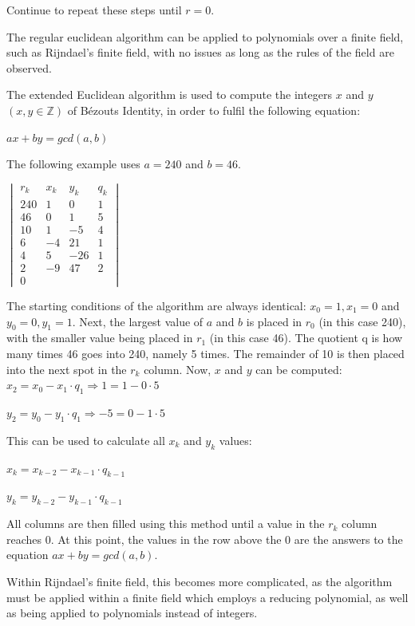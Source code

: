 \documentclass[12pt]{report}
\theoremstyle{definition}
\theoremstyle{remark}
\begin{document}
Continue to repeat these steps until $r=0$.

The regular euclidean algorithm can be applied to polynomials over a finite field, such as Rijndael's finite field, with no issues as long as the rules of the field are observed\cite{EuclideanPolynomials}.

The extended Euclidean algorithm is used to compute the integers $x$ and $y$ $({x,y} \in \mathbb{Z})$ of B\'ezouts Identity\cite{Bezout}, in order to fulfil the following equation:

$ax+by = gcd(a,b)$

The following example uses $a=240$ and $b=46$.

\begin{center}
$\begin{vmatrix}
r_k & x_k & y_k & q_k \\
240 & 1 & 0 & 1 \\
46 & 0 & 1 & 5 \\
10 & 1 & -5 & 4 \\
6 & -4 & 21 & 1 \\
4 & 5 & -26 & 1 \\
2 & -9 & 47 & 2 \\
0 &  &  &  \end{vmatrix}$
\end{center}

The starting conditions of the algorithm are always identical: $x_0=1, x_1=0$ and $y_0=0, y_1=1$. Next, the largest value of $a$ and $b$ is placed in $r_0$ (in this case 240), with the smaller value being placed in $r_1$ (in this case 46). The quotient q is how many times 46 goes into 240, namely 5 times. The remainder of 10 is then placed into the next spot in the $r_k$ column. Now, $x$ and $y$ can be computed:
$x_2=x_0-x_1 \cdot q_1 \Rightarrow 1=1-0 \cdot 5$

$y_2=y_0-y_1 \cdot q_1 \Rightarrow -5=0-1 \cdot 5$

This can be used to calculate all $x_k$ and $y_k$ values\cite{EuclidGeneralization}:

$x_k=x_{k-2}-x_{k-1} \cdot q_{k-1}$

$y_k=y_{k-2}-y_{k-1} \cdot q_{k-1}$

All columns are then filled using this method until a value in the $r_k$ column reaches 0. At this point, the values in the row above the 0 are the answers to the equation $ax+by = gcd(a,b)$.

Within Rijndael’s finite field, this becomes more complicated, as the algorithm must be applied within a finite field which employs a reducing polynomial, as well as being applied to polynomials instead of integers.
\end{document}
